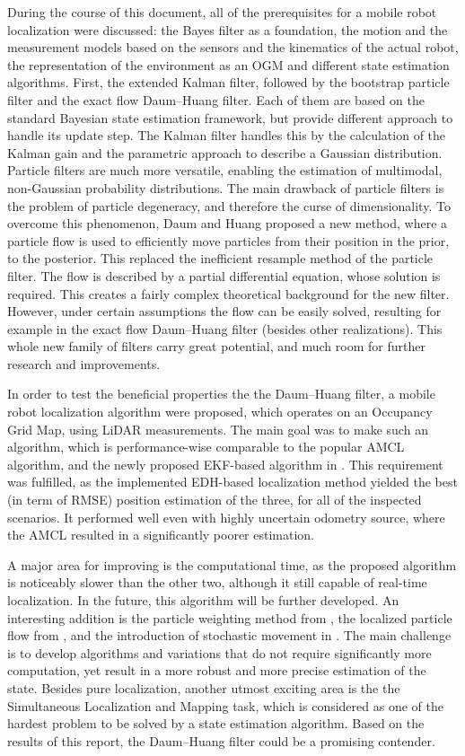During the course of this document, all of the prerequisites for a mobile robot localization were
discussed: the Bayes filter as a foundation,
the motion and the measurement models based on the
sensors and the kinematics of the actual robot,
the representation of the environment as an OGM and
different state estimation algorithms.
First, the extended Kalman filter, followed by the bootstrap particle filter and the exact
flow Daum–Huang filter. Each of them are based on the standard Bayesian state
estimation framework, but provide different approach to handle its update step.
The Kalman filter handles this by the calculation of the Kalman gain and the parametric
approach to describe a Gaussian distribution. Particle filters are much more versatile,
enabling the estimation of multimodal, non-Gaussian probability distributions. The main
drawback of particle filters is the problem of particle degeneracy, and therefore the curse
of dimensionality. To overcome this phenomenon, Daum and Huang proposed a new
method, where a particle flow is used to efficiently move particles from their position in
the prior, to the posterior. This replaced the inefficient resample method of the particle
filter. The flow is described by a partial differential equation, whose solution is required.
This creates a fairly complex theoretical background for the new filter. However, under
certain assumptions the flow can be easily solved, resulting for example in the exact flow
Daum–Huang filter (besides other realizations).
This whole new family of filters carry great potential, and much room for further research
and improvements.

In order to test the beneficial properties the the Daum–Huang filter, a mobile robot
localization algorithm were proposed, which operates on an Occupancy Grid Map, using
LiDAR measurements. The main goal was to make such an algorithm, which is
performance-wise comparable to the popular AMCL algorithm, and the newly proposed EKF-based
algorithm in \cite{Dantanarayana2016}.
This requirement was fulfilled, as the implemented EDH-based localization method
yielded the best (in term of RMSE) position estimation of the three, for all of the
inspected scenarios. It performed well even with highly uncertain odometry source,
where the AMCL resulted in a significantly poorer estimation.

A major area for improving is the computational time, as the proposed algorithm is noticeably
slower than the other two, although it still capable of real-time localization.
In the future, this algorithm will be further developed.
An interesting addition is the particle weighting method from \cite{Li2016}, the localized
particle flow from \cite{Ding2012}, and the introduction of stochastic movement in \cite{Dai2021}.
The main challenge is to develop algorithms and variations that do not require significantly
more computation, yet result in a more robust and more precise estimation of the
state. Besides pure localization, another utmost exciting area is the
the Simultaneous Localization and Mapping task, which is considered as one of the
hardest problem to be solved by a state estimation algorithm. Based on the results
of this report, the Daum--Huang filter could be a promising contender.

